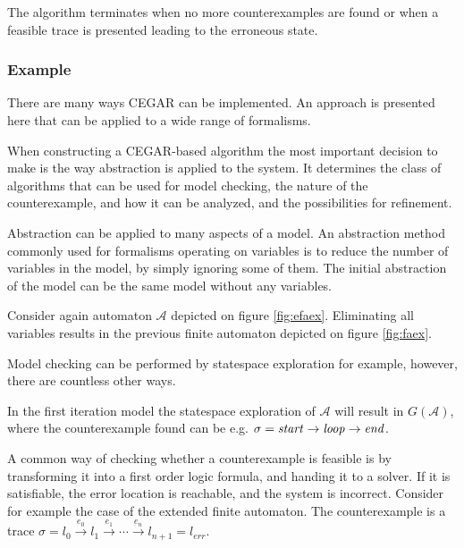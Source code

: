 The algorithm terminates when no more
counterexamples are found or when a feasible trace is
presented leading to the erroneous state.

\subsubsection{Example} \label{sec:cegarex}

There are many ways CEGAR can be implemented. An approach is presented here that can be applied to a wide range of formalisms.

When constructing a CEGAR-based algorithm the most important decision to make is the way abstraction is applied to the system. It determines the class of algorithms that can be used for model checking, the nature of the counterexample, and how it can be analyzed, and the possibilities for refinement. 

 Abstraction can be applied to many aspects of a model. An abstraction method commonly used for formalisms operating on variables is to reduce the number of variables in the model, by simply ignoring some of them. The initial abstraction of the model can be the same model without any variables.
 
 \begin{example}
 	Consider again automaton $\mathcal{A}$ depicted on figure \ref{fig:efaex}. Eliminating all variables results in the previous finite automaton depicted on figure \ref{fig:faex}.
 \end{example}

Model checking can be performed by statespace exploration for example, however, there are countless other ways.

 \begin{example}
 	In the first iteration model the statespace exploration of $\mathcal{A}$ will result in $G(\mathcal{A})$, where the counterexample found can be e.g. $\sigma = \text{\emph{start}} \to \text{\emph{loop}} \to \text{\emph{end}}$.
 \end{example}
 
 A common way of checking whether a counterexample  is feasible is by transforming it into a first order logic formula, and handing it to a solver. If it is satisfiable, the error location is reachable, and the system is incorrect. Consider for example the case of the extended finite automaton. The counterexample is a trace $\sigma = l_0 \xrightarrow{e_0} l_1 \xrightarrow{e_1} \cdots \xrightarrow{e_n} l_{n+1}=l_{err}$.

